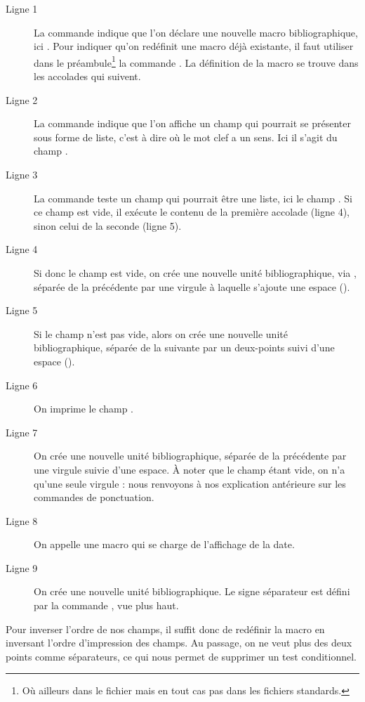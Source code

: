 \begin{description}
\item[Ligne 1] La commande  indique que l'on déclare une nouvelle macro bibliographique, ici . Pour indiquer qu'on redéfinit une macro déjà existante, il faut utiliser dans le préambule\footnote{Où ailleurs dans le fichier  mais en tout cas pas dans les fichiers standards.} la commande . La définition de la macro se trouve dans les accolades qui suivent.
\item[Ligne 2] La commande  indique que l'on affiche un champ qui pourrait se présenter sous forme de liste, c'est à dire où le mot clef  a un sens. Ici il s'agit du champ .
\item[Ligne 3] La commande  teste un champ qui pourrait être une liste, ici le champ . Si ce champ est vide, il exécute le contenu de la première accolade (ligne 4), sinon celui de la seconde (ligne 5).
\item[Ligne 4] Si donc le champ  est vide, on crée une nouvelle unité bibliographique, via  ,\label{unitepersonalisee} séparée de la précédente par une virgule à laquelle s'ajoute une espace ().
\item[Ligne 5] Si le champ  n'est pas vide, alors on crée une nouvelle unité bibliographique, séparée de la suivante par un deux-points suivi d'une espace ().
\item[Ligne 6] On imprime le champ .
\item[Ligne 7] On crée une nouvelle unité bibliographique, séparée de la précédente par une virgule suivie d'une espace. À noter que le champ  étant vide, on n'a qu'une seule virgule : nous renvoyons à nos explication antérieure sur les commandes de ponctuation.
\item[Ligne 8] On appelle une macro qui se charge de l'affichage de la date.
\item[Ligne 9] On crée une nouvelle unité bibliographique. Le signe séparateur est défini par la commande , vue plus haut.
\end{description}

Pour inverser l'ordre de nos champs, il suffit donc de redéfinir la macro en inversant l'ordre d'impression des champs. Au passage, on ne veut plus des deux points comme séparateurs, ce qui nous permet de supprimer un test conditionnel.


